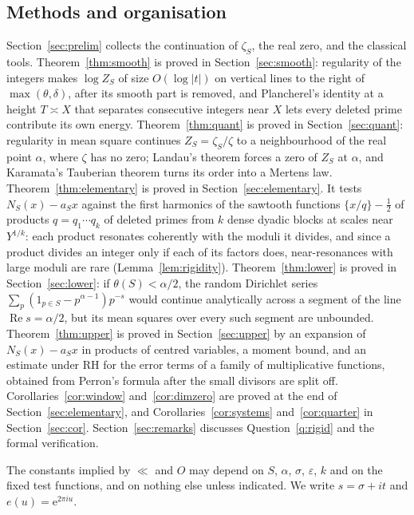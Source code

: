 \documentclass[11pt]{amsart}
\theoremstyle{remark}
\numberwithin{equation}{section}
\newcommand{\eps}{\varepsilon}
\newcommand{\e}{\mathrm{e}}
\DeclareMathOperator{\re}{Re}
\begin{document}
\subsection{Methods and organisation}
Section~\ref{sec:prelim} collects the continuation of $\zeta_S$, the real zero, and the classical tools. Theorem~\ref{thm:smooth} is proved in Section~\ref{sec:smooth}: regularity of the integers makes $\log Z_S$ of size $O(\log|t|)$ on vertical lines to the right of $\max(\theta,\delta)$, after its smooth part is removed, and Plancherel's identity at a height $T\asymp X$ that separates consecutive integers near $X$ lets every deleted prime contribute its own energy. Theorem~\ref{thm:quant} is proved in Section~\ref{sec:quant}: regularity in mean square continues $Z_S=\zeta_S/\zeta$ to a neighbourhood of the real point $\alpha$, where $\zeta$ has no zero; Landau's theorem forces a zero of $Z_S$ at $\alpha$, and Karamata's Tauberian theorem turns its order into a Mertens law. Theorem~\ref{thm:elementary} is proved in Section~\ref{sec:elementary}. It tests $N_S(x)-a_Sx$ against the first harmonics of the sawtooth functions $\{x/q\}-\tfrac12$ of products $q=q_1\cdots q_k$ of deleted primes from $k$ dense dyadic blocks at scales near $Y^{1/k}$: each product resonates coherently with the moduli it divides, and since a product divides an integer only if each of its factors does, near-resonances with large moduli are rare (Lemma~\ref{lem:rigidity}). Theorem~\ref{thm:lower} is proved in Section~\ref{sec:lower}: if $\theta(S)<\alpha/2$, the random Dirichlet series $\sum_p(1_{p\in S}-p^{\alpha-1})p^{-s}$ would continue analytically across a segment of the line $\re s=\alpha/2$, but its mean squares over every such segment are unbounded. Theorem~\ref{thm:upper} is proved in Section~\ref{sec:upper} by an expansion of $N_S(x)-a_Sx$ in products of centred variables, a moment bound, and an estimate under RH for the error terms of a family of multiplicative functions, obtained from Perron's formula after the small divisors are split off. Corollaries~\ref{cor:window} and~\ref{cor:dimzero} are proved at the end of Section~\ref{sec:elementary}, and Corollaries~\ref{cor:systems} and~\ref{cor:quarter} in Section~\ref{sec:cor}. Section~\ref{sec:remarks} discusses Question~\ref{q:rigid} and the formal verification.

The constants implied by $\ll$ and $O$ may depend on $S$, $\alpha$, $\sigma$, $\eps$, $k$ and on the fixed test functions, and on nothing else unless indicated. We write $s=\sigma+it$ and $e(u)=\e^{2\pi iu}$.
\end{document}
